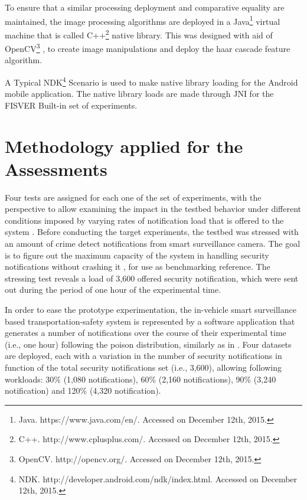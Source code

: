To ensure that a similar processing deployment and comparative equality are maintained, the image processing algorithms are deployed in a Java\footnote[20]{Java. https://www.java.com/en/. Accessed on December 12th, 2015.} virtual machine that is called C++\footnote[21]{C++. http://www.cplusplus.com/. Accessed on December 12th, 2015.} native library. This was designed with aid of OpenCV\footnote[22]{OpenCV. http://opencv.org/. Accessed on December 12th, 2015.} , to create image manipulations and deploy the haar cascade feature algorithm. 

A Typical NDK\footnote[23]{NDK. http://developer.android.com/ndk/index.html. Accessed on December 12th, 2015.} Scenario is used to make native library loading for the Android mobile application. The native library loads are made through JNI for the FISVER Built-in set of experiments.

\section{Methodology applied for the Assessments}

Four tests are assigned for each one of the set of experiments, with the perspective to allow examining the impact in the testbed behavior under different conditions imposed by varying rates of notification load that is offered to the system \cite{Evaluation2}. Before conducting the target experiments, the testbed was stressed with an amount of crime detect notifications from smart surveillance camera. The goal is to figure out the maximum capacity of the system in handling security notifications without crashing it \cite{Evaluation4}, for use as benchmarking reference. The stressing test reveals a load of 3,600 offered security notification, which were sent out during the period of one hour of the experimental time.

In order to ease the prototype experimentation, the in-vehicle smart surveillance based transportation-safety system is represented by a software application that generates a number of notifications over the course of their experimental time (i.e., one hour) following the poison distribution, similarly as in \cite{Evaluation3}. Four datasets are deployed, each with a variation in the number of security notifications in function of the total security notifications set (i.e.,  3,600), allowing following workloads: 30\% (1,080 notifications), 60\% (2,160 notifications), 90\% (3,240 notification) and 120\% (4,320 notification). 


